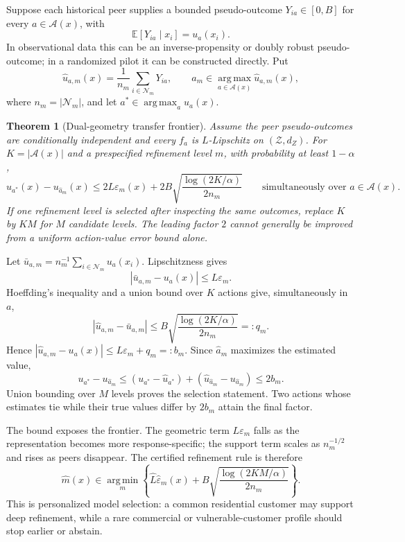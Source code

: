 \documentclass[11pt]{article}
\makeatletter
\theoremstyle{noteplain}
\newtheorem{theorem}{Theorem}
\theoremstyle{definition}
\renewenvironment{proof}[1][\proofname]{\par
  \pushQED{\qed}%
  \normalfont \topsep6\p@\@plus6\p@\relax
  \trivlist
  \item[\hskip\labelsep\bfseries #1\@addpunct{.}]\ignorespaces
}{%
  \popQED\endtrivlist\@endpefalse
}
\newcommand{\E}{\mathbb E}
\newcommand{\cA}{\mathcal A}
\newcommand{\cN}{\mathcal N}
\newcommand{\argmax}{\operatorname*{arg\,max}}
\newcommand{\argmin}{\operatorname*{arg\,min}}
\makeatother
\begin{document}
Suppose each historical peer supplies a bounded pseudo-outcome $Y_{ia}\in[0,B]$ for every $a\in\cA(x)$, with
\[
 \E[Y_{ia}\mid x_i]=u_a(x_i).
\]
In observational data this can be an inverse-propensity or doubly robust pseudo-outcome; in a randomized pilot it can be constructed directly.  Put
\[
 \widehat u_{a,m}(x)=\frac1{n_m}\sum_{i\in\cN_m}Y_{ia},\qquad
 \widehat a_m\in\argmax_{a\in\cA(x)}\widehat u_{a,m}(x),
\]
where $n_m=|\cN_m|$, and let $a^*\in\argmax_a u_a(x)$.

\begin{theorem}[Dual-geometry transfer frontier]\label{thm:frontier}
Assume the peer pseudo-outcomes are conditionally independent and every $f_a$ is $L$-Lipschitz on $(\mathcal Z,d_Z)$.  For $K=|\cA(x)|$ and a prespecified refinement level $m$, with probability at least $1-\alpha$,
\begin{equation}\label{eq:certificate}
 u_{a^*}(x)-u_{\widehat a_m}(x)
 \leq
 2L\varepsilon_m(x)
 +2B\sqrt{\frac{\log(2K/\alpha)}{2n_m}}
 \qquad\text{simultaneously over }a\in\cA(x).
\end{equation}
If one refinement level is selected after inspecting the same outcomes, replace $K$ by $KM$ for $M$ candidate levels.  The leading factor $2$ cannot generally be improved from a uniform action-value error bound alone.
\end{theorem}

\begin{proof}
Let $\bar u_{a,m}=n_m^{-1}\sum_{i\in\cN_m}u_a(x_i)$.  Lipschitzness gives
\[
 |\bar u_{a,m}-u_a(x)|\leq L\varepsilon_m.
\]
Hoeffding's inequality and a union bound over $K$ actions give, simultaneously in $a$,
\[
 |\widehat u_{a,m}-\bar u_{a,m}|
 \leq B\sqrt{\frac{\log(2K/\alpha)}{2n_m}}=:q_m.
\]
Hence $|\widehat u_{a,m}-u_a(x)|\leq L\varepsilon_m+q_m=:b_m$.  Since $\widehat a_m$ maximizes the estimated value,
\[
 u_{a^*}-u_{\widehat a_m}
 \leq (u_{a^*}-\widehat u_{a^*})
 +(\widehat u_{\widehat a_m}-u_{\widehat a_m})\leq2b_m.
\]
Union bounding over $M$ levels proves the selection statement.  Two actions whose estimates tie while their true values differ by $2b_m$ attain the final factor.
\end{proof}

The bound exposes the frontier.  The geometric term $L\varepsilon_m$ falls as the representation becomes more response-specific; the support term scales as $n_m^{-1/2}$ and rises as peers disappear.  The certified refinement rule is therefore
\begin{equation}\label{eq:selection}
 \widehat m(x)\in\argmin_m
 \left\{\widehat L\widehat\varepsilon_m(x)
 +B\sqrt{\frac{\log(2KM/\alpha)}{2n_m}}\right\}.
\end{equation}
This is personalized model selection: a common residential customer may support deep refinement, while a rare commercial or vulnerable-customer profile should stop earlier or abstain.
\end{document}
